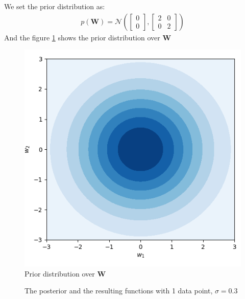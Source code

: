 \documentclass[12pt]{article}
\newenvironment{question}[2][Question]{\begin{trivlist}
\kern10pt
\item[\hskip \labelsep {\bfseries #1}\hskip \labelsep {\bfseries #2.}]}{\end{trivlist}}
\begin{document}
\begin{question}{9}
We set the prior distribution as:
  \begin{align*}
    p(\mathbf{W}) = 
      \mathcal{N}(
        \begin{bmatrix}
          0\\ 
          0
        \end{bmatrix},
        \begin{bmatrix}
          2 & 0\\ 
          0 & 2
        \end{bmatrix}
      )
  \end{align*}
And the figure \ref{fig:Q9-prior} shows the prior distribution over $\mathbf{W}$
\begin{figure}[h!]
  \centering
  \includegraphics[width=0.5\linewidth]{fig/Q9-prior.png}
  \caption{Prior distribution over $\mathbf{W}$}
  \label{fig:Q9-prior}
\end{figure}

\begin{figure}[h!]
  \hfill
  \caption{The posterior and the resulting functions with 1 data point, $\sigma = 0.3$}
\end{figure}


\end{question}
\end{document}
